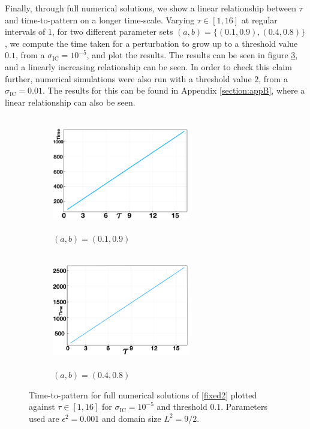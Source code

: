 Finally, through full numerical solutions, we show a linear relationship between $\tau$ and time-to-pattern on a longer time-scale. Varying $\tau\in[1,16]$ at regular intervals of $1$, for two different parameter sets $(a,b)=\{(0.1,0.9),(0.4,0.8)\}$, we compute the time taken for a perturbation to grow up to a threshold value $0.1$, from a $\sigma_{\text{IC}}=10^{-5}$, and plot the results. The results can be seen in figure \ref{fig:linperturb1}, and a linearly increasing relationship can be seen. In order to check this claim further, numerical simulations were also run with a threshold value $2$, from a $\sigma_{\text{IC}}=0.01$. The results for this can be found in Appendix \ref{section:appB}, where a linear relationship can also be seen.
\begin{figure}[H]
    \centering
    \begin{subfigure}[t]{0.45\textwidth}
        \centering
        \includegraphics[width=6cm,height=5cm]{longlin2.png}
        \caption{$(a,b)=(0.1,0.9)$}
        \label{fig:linperturb1a}
    \end{subfigure}
    \hfill
    \begin{subfigure}[t]{0.45\textwidth}
        \centering
        \includegraphics[width=6cm,height=5cm]{longlin3.png}
        \caption{$(a,b)=(0.4,0.8)$}
        \label{fig:linperturb1b}
    \end{subfigure}
    \caption{Time-to-pattern for full numerical solutions of \eqref{fixed2} plotted against $\tau\in[1,16]$ for $\sigma_{\text{IC}}=10^{-5}$ and threshold $0.1$. Parameters used are $\epsilon^2=0.001$ and domain size $L^2=9/2$.}
    \label{fig:linperturb1}
\end{figure}

